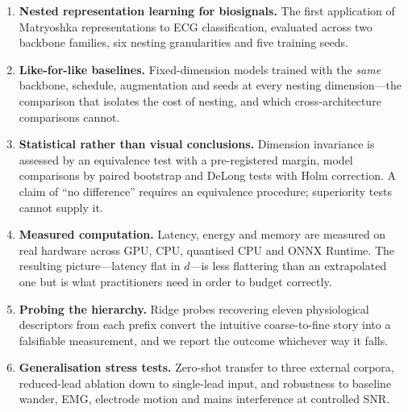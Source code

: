 \begin{enumerate}
\item \textbf{Nested representation learning for biosignals.} The first
application of Matryoshka representations to ECG classification, evaluated
across two backbone families, six nesting granularities and five training
seeds.

\item \textbf{Like-for-like baselines.} Fixed-dimension models trained with
the \emph{same} backbone, schedule, augmentation and seeds at every nesting
dimension---the comparison that isolates the cost of nesting, and which
cross-architecture comparisons cannot.

\item \textbf{Statistical rather than visual conclusions.} Dimension
invariance is assessed by an equivalence test with a pre-registered margin,
model comparisons by paired bootstrap and DeLong tests with Holm correction.
A claim of ``no difference'' requires an equivalence procedure; superiority
tests cannot supply it.

\item \textbf{Measured computation.} Latency, energy and memory are measured
on real hardware across GPU, CPU, quantised CPU and ONNX Runtime. The
resulting picture---latency flat in $d$---is less flattering than an
extrapolated one but is what practitioners need in order to budget correctly.

\item \textbf{Probing the hierarchy.} Ridge probes recovering eleven
physiological descriptors from each prefix convert the intuitive
coarse-to-fine story into a falsifiable measurement, and we report the outcome
whichever way it falls.

\item \textbf{Generalisation stress tests.} Zero-shot transfer to three
external corpora, reduced-lead ablation down to single-lead input, and
robustness to baseline wander, EMG, electrode motion and mains interference at
controlled SNR.
\end{enumerate}
